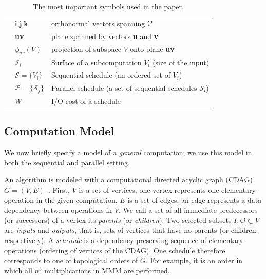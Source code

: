 \documentclass[sigplan,review,anonymous]{acmart}\settopmatter{printfolios=true,printccs=false,printacmref=false}
\begin{document}
\begin{table}[h!]
\begin{tabular}{@{}l|ll@{}}
		& \textbf{i},\textbf{j},\textbf{k} & orthonormal vectors spanning 
		$\mathcal{V}$\\
		& \textbf{uv} & plane spanned by vectors \textbf{u} and \textbf{v}\\
		& $\phi_{uv}(V)$ & projection of subspace $V$ onto plane \textbf{uv}\\
		& $\mathcal{I}_i$ & Surface of a subcomputation $V_i$ (size of the 
		input)\\
		& $\mathcal{S} = \{V_i\}$ & Sequential schedule (an ordered set of 
		 $V_i$) \\ 
		& $\mathcal{P} = \{\mathcal{S}_j\}$ & Parallel schedule (a set of 
		sequential schedules $\mathcal{S}_i$) \\
		& $W$ & I/O cost of a schedule \\
		\midrule
		
		\bottomrule
	\end{tabular}
	\caption{The most important symbols used in the paper.}
	\label{tab:symbols}
	\vspace{-0.5em}
\end{table}
\subsection{Computation Model}

We now briefly specify a model of a \emph{general} computation; we use this
model in both the sequential and parallel setting.

An algorithm is modeled with a computational directed acyclic graph 
(CDAG) $G=(V,E)$~\cite{completeRegisterProblems,pebblegameregister, 
registerpebblecolor}.
First, $V$ is a set of
vertices; one vertex represents one elementary operation in the given
computation. $E$ is a
set of edges; an edge represents a data dependency between operations in
$V$. We call a set of all immediate predecessors (or successors) of a vertex 
its \emph{parents} (or \emph{children}). 
Two selected subsets $I, O \subset V$ are \emph{inputs} and \emph{outputs}, 
that is, sets of vertices that have no parents (or children, 
respectively).
%
A \emph{schedule} is a dependency-preserving sequence of 
elementary operations (ordering of vertices of the CDAG). One schedule 
therefore 
corresponds to one of topological orders of $G$. For example, it is an 
order 
in which all $n^3$ multiplications in MMM are performed.
\end{document}
